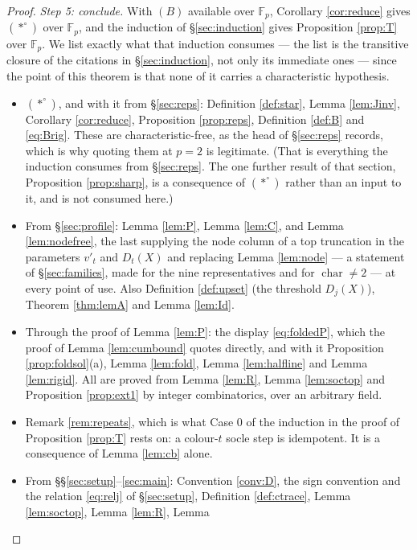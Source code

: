 \documentclass[reqno]{amsart}
\theoremstyle{plain}
\theoremstyle{definition}
\begin{document}
\begin{proof}
\smallskip\noindent
\emph{Step 5: conclude.}  With $(B)$ available over $\mathbb{F}_p$,
Corollary \ref{cor:reduce} gives $(*^\circ)$ over $\mathbb{F}_p$, and the
induction of \S\ref{sec:induction} gives Proposition \ref{prop:T} over
$\mathbb{F}_p$.  We list exactly what that induction consumes --- the list is
the transitive closure of the citations in \S\ref{sec:induction}, not only its
immediate ones --- since the point of this theorem is that none of it carries a
characteristic hypothesis.
\begin{itemize}\itemsep1pt
\item $(*^\circ)$, and with it from \S\ref{sec:reps}: Definition
\ref{def:star}, Lemma \ref{lem:Jinv}, Corollary \ref{cor:reduce}, Proposition
\ref{prop:reps}, Definition \ref{def:B} and \eqref{eq:Brig}.  These are
characteristic-free, as the head of \S\ref{sec:reps} records, which is why
quoting them at $p=2$ is legitimate.  (That is everything the induction
consumes from \S\ref{sec:reps}.  The one further result of that section,
Proposition \ref{prop:sharp}, is a consequence of $(*^\circ)$ rather than an
input to it, and is not consumed here.)
\item From \S\ref{sec:profile}: Lemma \ref{lem:P}, Lemma \ref{lem:C}, and Lemma
\ref{lem:nodefree}, the last supplying the node column of a top truncation in
the parameters $v'_t$ and $D_t(X)$ and replacing Lemma \ref{lem:node} --- a
statement of \S\ref{sec:families}, made for the nine representatives and for
$\operatorname{char}\ne2$ --- at every point of use.  Also Definition
\ref{def:upset} (the threshold $D_j(X)$), Theorem \ref{thm:lemA} and Lemma
\ref{lem:Id}.
\item Through the proof of Lemma \ref{lem:P}: the display \eqref{eq:foldedP},
which the proof of Lemma \ref{lem:cumbound} quotes directly, and with it
Proposition \ref{prop:foldsol}\textup{(a)}, Lemma \ref{lem:fold}, Lemma
\ref{lem:halfline} and Lemma \ref{lem:rigid}.  All are proved from Lemma
\ref{lem:R}, Lemma \ref{lem:soctop} and Proposition \ref{prop:ext1} by
integer combinatorics, over an arbitrary field.
\item Remark \ref{rem:repeats}, which is what Case $0$ of the induction in the
proof of Proposition \ref{prop:T} rests on: a colour-$t$ socle step is
idempotent.  It is a consequence of Lemma \ref{lem:cb} alone.
\item From \S\S\ref{sec:setup}--\ref{sec:main}: Convention \ref{conv:D}, the
sign convention and the relation \eqref{eq:relj} of \S\ref{sec:setup},
Definition \ref{def:ctrace}, Lemma \ref{lem:soctop}, Lemma \ref{lem:R}, Lemma

\end{itemize}
\end{proof}
\end{document}
